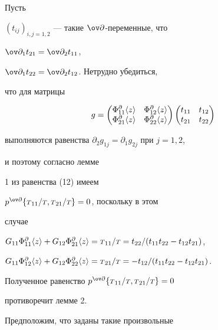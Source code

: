 \begin{pf}
Пусть 


$(t_{ij})_{i,j=1,2}$ --- такие $\ov\partial$-переменные, что 


$\ov\partial_1t_{21}=\ov\partial_2t_{11}$, 


$\ov\partial_1t_{22}=\ov\partial_2t_{12}$. Нетрудно убедиться,  


что для матрицы 


$$


g= 


\begin{pmatrix} 


\Phi^\partial_{11}\la z \ra & \Phi^\partial_{12}\la z \ra \\ 


\Phi^\partial_{21}\la z \ra & \Phi^\partial_{22}\la z \ra 


\end{pmatrix} 


\begin{pmatrix} 


t_{11} & t_{12} \\ t_{21} & t_{22} 


\end{pmatrix} 


$$


выполняются равенства $\partial_2g_{1j}=\partial_1g_{2j}$ при $j=1,2$, 


и поэтому согласно лемме  


1 из равенства (12) имеем 


$p^{\ov\partial}\{\st_{11}/\st,\st_{21}/\st\}=0$, поскольку в этом 


случае 


$G_{11}\Phi^\partial_{11}\la z \ra+ 


G_{12}\Phi^\partial_{21}\la z \ra=\st_{11}/\st=t_{22}/ 


(t_{11}t_{22}-t_{12}t_{21})$, 


$G_{11}\Phi^\partial_{12}\la z \ra+ 


G_{12}\Phi^\partial_{22}\la z \ra=\st_{21}/\st= 


-t_{12}/(t_{11}t_{22}-t_{12}t_{21})$. 


Полученное равенство $p^{\ov\partial}\{\st_{11}/\st,\st_{21}/\st\}=0$ 


противоречит лемме 2.


\end{pf}


 


Предположим, что заданы такие произвольные 


